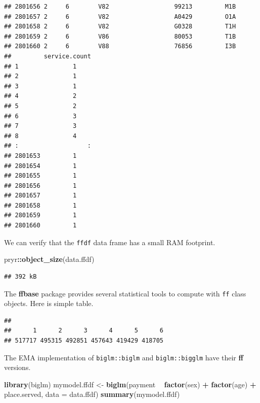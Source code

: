\documentclass[]{book}
\newenvironment{Shaded}{\begin{snugshade}}{\end{snugshade}}
\newcommand{\DataTypeTok}[1]{\textcolor[rgb]{0.13,0.29,0.53}{#1}}
\newcommand{\KeywordTok}[1]{\textcolor[rgb]{0.13,0.29,0.53}{\textbf{#1}}}
\newcommand{\NormalTok}[1]{#1}
\newcommand{\OperatorTok}[1]{\textcolor[rgb]{0.81,0.36,0.00}{\textbf{#1}}}
\newcommand{\StringTok}[1]{\textcolor[rgb]{0.31,0.60,0.02}{#1}}
\theoremstyle{definition}
\theoremstyle{definition}
\theoremstyle{definition}
\theoremstyle{remark}
\begin{document}
\begin{verbatim}
## 2801656 2     6        V82                  99213         M1B  
## 2801657 2     6        V82                  A0429         O1A  
## 2801658 2     6        V82                  G0328         T1H  
## 2801659 2     6        V86                  80053         T1B  
## 2801660 2     6        V88                  76856         I3B  
##         service.count
## 1               1    
## 2               1    
## 3               1    
## 4               2    
## 5               2    
## 6               3    
## 7               3    
## 8               4    
## :                   :
## 2801653         1    
## 2801654         1    
## 2801655         1    
## 2801656         1    
## 2801657         1    
## 2801658         1    
## 2801659         1    
## 2801660         1
\end{verbatim}

We can verify that the \texttt{ffdf} data frame has a small RAM footprint.

\begin{Shaded}
\begin{Highlighting}[]
\NormalTok{pryr}\OperatorTok{::}\KeywordTok{object_size}\NormalTok{(data.ffdf)}
\end{Highlighting}
\end{Shaded}

\begin{verbatim}
## 392 kB
\end{verbatim}

The \textbf{ffbase} package provides several statistical tools to compute with \texttt{ff} class objects.
Here is simple table.

\begin{Shaded}
\end{Shaded}

\begin{verbatim}
## 
##      1      2      3      4      5      6 
## 517717 495315 492851 457643 419429 418705
\end{verbatim}

The EMA implementation of \texttt{biglm::biglm} and \texttt{biglm::bigglm} have their \textbf{ff} versions.

\begin{Shaded}
\begin{Highlighting}[]
\KeywordTok{library}\NormalTok{(biglm)}
\NormalTok{mymodel.ffdf <-}\StringTok{ }\KeywordTok{biglm}\NormalTok{(payment }\OperatorTok{~}\StringTok{ }\KeywordTok{factor}\NormalTok{(sex) }\OperatorTok{+}\StringTok{ }\KeywordTok{factor}\NormalTok{(age) }\OperatorTok{+}\StringTok{ }\NormalTok{place.served, }
                              \DataTypeTok{data =}\NormalTok{ data.ffdf)}
\KeywordTok{summary}\NormalTok{(mymodel.ffdf)}
\end{Highlighting}
\end{Shaded}
\end{document}
